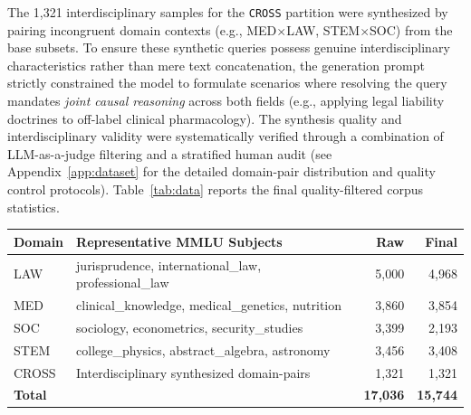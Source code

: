 \documentclass[a4paper,fleql]{cas-sc}
\begin{document}
The 1,321 interdisciplinary samples for the \texttt{CROSS}
partition were synthesized by pairing incongruent domain contexts
(e.g., MED$\times$LAW, STEM$\times$SOC) from the base subsets. To ensure
these synthetic queries possess genuine interdisciplinary characteristics
rather than mere text concatenation, the generation prompt strictly
constrained the model to formulate scenarios where resolving the query
mandates \emph{joint causal reasoning} across both fields (e.g., applying
legal liability doctrines to off-label clinical pharmacology). The synthesis
quality and interdisciplinary validity were systematically verified through a
combination of LLM-as-a-judge filtering and a stratified human audit (see
Appendix~\ref{app:dataset} for the detailed domain-pair distribution and
quality control protocols). Table~\ref{tab:data} reports the final
quality-filtered corpus statistics.

\vspace{6pt}
\begin{center}
\begingroup
{}
\label{tab:data}
\begin{tabular}{llrr}
\toprule
\textbf{Domain} & \textbf{Representative MMLU Subjects} & \textbf{Raw} & \textbf{Final} \\
\midrule
LAW   & jurisprudence, international\_law, professional\_law  & 5{,}000 & 4{,}968 \\
MED   & clinical\_knowledge, medical\_genetics, nutrition      & 3{,}860 & 3{,}854 \\
SOC   & sociology, econometrics, security\_studies             & 3{,}399 & 2{,}193 \\
STEM  & college\_physics, abstract\_algebra, astronomy         & 3{,}456 & 3{,}408 \\
CROSS & Interdisciplinary synthesized domain-pairs             & 1{,}321 & 1{,}321 \\
\midrule
\textbf{Total} & & \textbf{17{,}036} & \textbf{15{,}744} \\
\bottomrule
\end{tabular}
\endgroup
\end{center}
\vspace{6pt}
\end{document}
